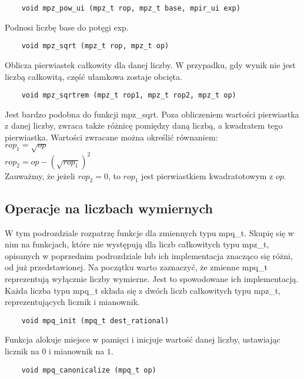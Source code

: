 \documentclass[oneside,a4paper]{book}
\begin{document}
	\begin{lstlisting}
	void mpz_pow_ui (mpz_t rop, mpz_t base, mpir_ui exp)
	\end{lstlisting}
	
	Podnosi liczbę base do potęgi exp.
	
	\begin{lstlisting}
	void mpz_sqrt (mpz_t rop, mpz_t op)
	\end{lstlisting}
	
	Oblicza pierwiastek całkowity dla danej liczby. W przypadku, gdy wynik nie jest liczbą całkowitą, część ułamkowa zostaje obcięta.
	
	\begin{lstlisting}
	void mpz_sqrtrem (mpz_t rop1, mpz_t rop2, mpz_t op)
	\end{lstlisting}
	
	Jest bardzo podobna do funkcji mpz\_sqrt. Poza obliczeniem wartości pierwiastka z danej liczby, zwraca także różnicę pomiędzy daną liczbą, a kwadratem tego pierwiastka. Wartości zwracane można określić równaniem: \\
	$rop_1 = \sqrt{op}$ \\
	$rop_2 = op - (\sqrt{rop_1})^2$ \\
	Zauważmy, że jeżeli $rop_2=0$, to $rop_1$ jest pierwiastkiem kwadratotowym z $op$.
	
	\subsection{Operacje na liczbach wymiernych}
	
	W tym podrozdziale rozpatrzę funkcje dla zmiennych typu mpq\_t. Skupię się w nim na funkcjach, które nie występują dla liczb całkowitych typu mpz\_t, opisanych w poprzednim podrozdziale lub ich implementacja znacząco się różni, od już przedstawionej.
	Na początku warto zaznaczyć, że zmienne mpq\_t reprezentują wyłącznie liczby wymierne. Jest to spowodowane ich implementacją. Każda liczba typu mpq\_t składa się z dwóch liczb całkowitych typu mpz\_t, reprezentujących licznik i mianownik.
	
	\begin{lstlisting}
	void mpq_init (mpq_t dest_rational)
	\end{lstlisting}
	
	Funkcja alokuje miejsce w pamięci i inicjuje wartość danej liczby, ustawiając licznik na $0$ i mianownik na $1$.
	
	\begin{lstlisting}
	void mpq_canonicalize (mpq_t op)
	\end{lstlisting}
	
\end{document}
